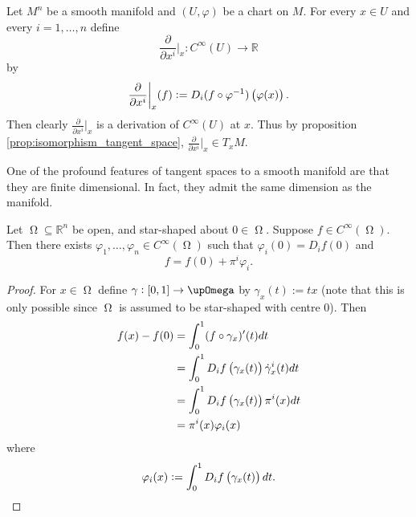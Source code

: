 \begin{example}
	Let $M^n$ be a smooth manifold and $(U,\varphi)$ be a chart on $M$. For every $x \in U$ and every $i = 1,\dots,n$ define 
	\begin{equation*}
		\frac{\partial}{\partial x^i}\bigg\vert_x : C^\infty(U) \to \mathbb{R}
	\end{equation*}
	\noindent by
	\begin{equation*}
		\frac{\partial}{\partial x^i}\bigg\vert_x(f) := D_i(f \circ \varphi^{-1})\del[1]{\varphi(x)}.
	\end{equation*}
	Then clearly $\frac{\partial}{\partial x^i}\big\vert_x$ is a derivation of $C^\infty(U)$ at $x$. Thus by proposition \ref{prop:isomorphism_tangent_space}, $\frac{\partial}{\partial x^i}\big\vert_x \in T_xM$. 
\end{example}

One of the profound features of tangent spaces to a smooth manifold are that they are finite dimensional. In fact, they admit the same dimension as the manifold.

\begin{lemma}
	\label{lem:star_shaped}
	Let $\upOmega \subseteq \mathbb{R}^n$ be open, and star-shaped about $0 \in \upOmega$. Suppose $f \in C^\infty(\upOmega)$. Then there exists $\varphi_1,\dots,\varphi_n \in C^\infty(\upOmega)$ such that $\varphi_i(0) = D_if(0)$ and
	\begin{equation*}
		f = f(0) + \pi^i \varphi_i.
	\end{equation*}
\end{lemma}

\begin{proof}
	For $x \in \upOmega$ define $\gamma : \intcc{0,1} \to \upOmega$ by $\gamma_x(t) := tx$ (note that this is only possible since $\upOmega$ is assumed to be star-shaped with centre $0$). Then
	\begin{align*}
		f(x) - f(0) &= \int_0^1 (f \circ \gamma_x)'(t) dt\\
		&= \int_0^1 D_if\del[1]{\gamma_x(t)} \dot{\gamma}^i_x(t) dt\\
		&= \int_0^1 D_if\del[1]{\gamma_x(t)} \pi^i(x)dt\\
		&= \pi^i(x)\varphi_i(x)
	\end{align*}
	\noindent where
	\begin{equation*}
		\varphi_i(x) := \int_0^1 D_if\del[1]{\gamma_x(t)} dt.
	\end{equation*}
\end{proof}

